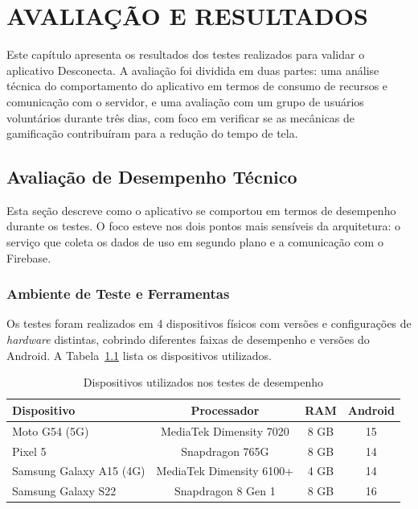 
\chapter{AVALIAÇÃO E RESULTADOS}

Este capítulo apresenta os resultados dos testes realizados para validar o aplicativo Desconecta. A avaliação foi dividida em duas partes: uma análise técnica do comportamento do aplicativo em termos de consumo de recursos e comunicação com o servidor, e uma avaliação com um grupo de usuários voluntários durante três dias, com foco em verificar se as mecânicas de gamificação contribuíram para a redução do tempo de tela.

\section{Avaliação de Desempenho Técnico}

Esta seção descreve como o aplicativo se comportou em termos de desempenho durante os testes. O foco esteve nos dois pontos mais sensíveis da arquitetura: o serviço que coleta os dados de uso em segundo plano e a comunicação com o Firebase.

\subsection{Ambiente de Teste e Ferramentas}

Os testes foram realizados em 4 dispositivos físicos com versões e configurações de \textit{hardware} distintas, cobrindo diferentes faixas de desempenho e versões do Android. A Tabela~\ref{tab:dispositivos} lista os dispositivos utilizados.

\begin{table}[htbp]
\centering
\caption{Dispositivos utilizados nos testes de desempenho}
\label{tab:dispositivos}
\begin{tabularx}{\textwidth}{|l|c|c|c|}
\hline
\rowcolor{verdeclaro}
\textbf{Dispositivo} & \textbf{Processador} & \textbf{RAM} & \textbf{Android} \\ \hline
Moto G54 (5G) & MediaTek Dimensity 7020 & 8 GB & 15 \\ \hline
Pixel 5 & Snapdragon 765G & 8 GB & 14 \\ \hline
Samsung Galaxy A15 (4G) & MediaTek Dimensity 6100+ & 4 GB & 14 \\ \hline
Samsung Galaxy S22 & Snapdragon 8 Gen 1 & 8 GB & 16 \\ \hline
\end{tabularx}
\end{table}


